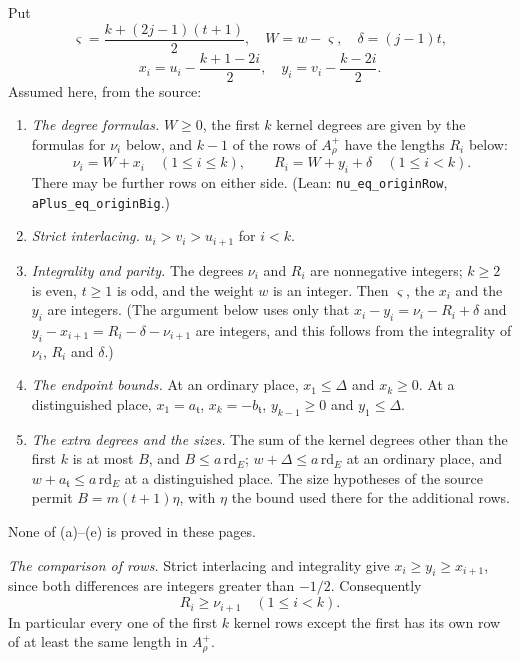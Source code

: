 \documentclass[11pt,letterpaper]{article}
\begin{document}
Put
\begin{equation}\label{D:175}
 \varsigma=\frac{k+(2j-1)(t+1)}2,\quad W=w-\varsigma,\quad \delta=(j-1)t,
\end{equation}
\begin{equation}\label{D:176}
 x_i=u_i-\frac{k+1-2i}{2},\quad y_i=v_i-\frac{k-2i}{2}.
\end{equation}
Assumed here, from the source:
\begin{enumerate}[label=\textup{(\alph*)},leftmargin=2.4em,itemsep=1pt,topsep=3pt]
\item \emph{The degree formulas.} $W\ge0$, the first $k$ kernel degrees are given by the formulas for $\nu_i$ below, and
$k-1$ of the rows of $A_\rho^+$ have the lengths $R_i$ below:
\begin{equation}\label{D:177}
  \nu_i=W+x_i\quad(1\le i\le k),\qquad
  R_i=W+y_i+\delta\quad(1\le i<k).
\end{equation}
There may be further rows on either side. (Lean: \texttt{nu\_eq\_originRow},
\texttt{aPlus\_eq\_originBig}.)
\item \emph{Strict interlacing.} $u_i>v_i>u_{i+1}$ for $i<k$.
\item \emph{Integrality and parity.} The degrees $\nu_i$ and $R_i$ are nonnegative integers; $k\ge2$ is even,
$t\ge1$ is odd, and the weight $w$ is an integer. Then $\varsigma$, the $x_i$ and the $y_i$ are integers.
(The argument below uses only that $x_i-y_i=\nu_i-R_i+\delta$ and $y_i-x_{i+1}=R_i-\delta-\nu_{i+1}$ are
integers, and this follows from the integrality of $\nu_i$, $R_i$ and $\delta$.)
\item \emph{The endpoint bounds.} At an ordinary place, $x_1\le\Delta$ and $x_k\ge0$. At a distinguished
place, $x_1=a_{\mathfrak t}$, $x_k=-b_{\mathfrak t}$, $y_{k-1}\ge0$ and $y_1\le\Delta$.
\item \emph{The extra degrees and the sizes.} The sum of the kernel degrees other than the first $k$ is at
most $B$, and $B\le a\,\mathrm{rd}_E$; $w+\Delta\le a\,\mathrm{rd}_E$ at an ordinary place, and
$w+a_{\mathfrak t}\le a\,\mathrm{rd}_E$ at a distinguished place. The size hypotheses of the source permit
$B=m(t+1)\eta$, with $\eta$ the bound used there for the additional rows.
\end{enumerate}
None of (a)--(e) is proved in these pages.

\emph{The comparison of rows.} Strict interlacing and integrality give
$x_i\ge y_i\ge x_{i+1}$, since both differences are integers greater
than $-1/2$. Consequently
\begin{equation}\label{D:178}
                         R_i\ge\nu_{i+1}\quad(1\le i<k).
\end{equation}
In particular every one of the first $k$ kernel rows except the first
has its own row of at least the same length in $A_\rho^+$.
\end{document}
